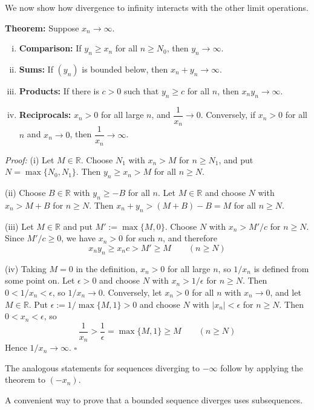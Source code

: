\documentclass[a4paper,11pt,abstracton]{scrartcl}
\newcommand{\RR}{\mathbb{R}}
\theoremstyle{dotlessP}
\theoremstyle{dotlessS}
\theoremstyle{remark}
\theoremstyle{definition}
\begin{document}
We now show how divergence to infinity interacts with the other limit operations.

\begin{problem_box}
\textbf{Theorem:}
Suppose $x_n\rightarrow\infty$.
\begin{enumerate}[(i)]
    \item \textbf{Comparison:} If $y_n\ge x_n$ for all $n\ge N_0$, then $y_n\rightarrow\infty$.
    \item \textbf{Sums:} If $(y_n)$ is bounded below, then $x_n+y_n\rightarrow\infty$.
    \item \textbf{Products:} If there is $c>0$ such that $y_n\ge c$ for all $n$, then $x_ny_n\rightarrow\infty$.
    \item \textbf{Reciprocals:} $x_n>0$ for all large $n$, and $\dfrac1{x_n}\rightarrow0$. Conversely, if $x_n>0$ for all $n$ and $x_n\rightarrow0$, then $\dfrac1{x_n}\rightarrow\infty$.
\end{enumerate}
\end{problem_box}

\begin{claim_box}
\textit{Proof:}
(i) Let $M\in\RR$. Choose $N_1$ with $x_n>M$ for $n\ge N_1$, and put $N=\max\{N_0,N_1\}$. Then $y_n\ge x_n>M$ for all $n\ge N$.

(ii) Choose $B\in\RR$ with $y_n\ge-B$ for all $n$. Let $M\in\RR$ and choose $N$ with $x_n>M+B$ for $n\ge N$. Then $x_n+y_n>(M+B)-B=M$ for all $n\ge N$.

(iii) Let $M\in\RR$ and put $M':=\max\{M,0\}$. Choose $N$ with $x_n>M'/c$ for $n\ge N$. Since $M'/c\ge0$, we have $x_n>0$ for such $n$, and therefore
\[
    x_ny_n\ge x_nc>M'\ge M\qquad(n\ge N)
\]

(iv) Taking $M=0$ in the definition, $x_n>0$ for all large $n$, so $1/x_n$ is defined from some point on. Let $\epsilon>0$ and choose $N$ with $x_n>1/\epsilon$ for $n\ge N$. Then $0<1/x_n<\epsilon$, so $1/x_n\rightarrow0$.
Conversely, let $x_n>0$ for all $n$ with $x_n\rightarrow0$, and let $M\in\RR$. Put $\epsilon:=1/\max\{M,1\}>0$ and choose $N$ with $|x_n|<\epsilon$ for $n\ge N$. Then $0<x_n<\epsilon$, so
\[
    \frac1{x_n}>\frac1\epsilon=\max\{M,1\}\ge M\qquad(n\ge N)
\]
Hence $1/x_n\rightarrow\infty$.
\hfill$\square$
\end{claim_box}

The analogous statements for sequences diverging to $-\infty$ follow by applying the theorem to $(-x_n)$.

A convenient way to prove that a bounded sequence diverges uses subsequences.
\end{document}
